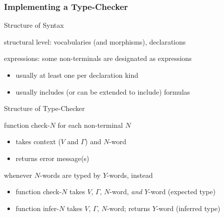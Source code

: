 \begin{frame}\frametitle{Implementing a Type-Checker}
\begin{blockitems}{Structure of Syntax}
\item structural level: vocabularies (and morphisms), declarations
\item expressions: some non-terminals are designated as expressions
 \begin{itemize}
 \item usually at least one per declaration kind
 \item usually includes (or can be extended to include) formulas
 \end{itemize}
\end{blockitems}

\begin{blockitems}{Structure of Type-Checker}
\item function check-$N$ for each non-terminal $N$
 \begin{itemize}
 \item takes context ($V$ and $\Gamma$) and $N$-word
 \item returns error message(s)
 \end{itemize}
\item whenever $N$-words are typed by $Y$-words, instead
 \begin{itemize}
 \item function check-$N$ takes $V$, $\Gamma$, $N$-word, \emph{and} $Y$-word (expected type)
 \item function infer-$N$ takes $V$, $\Gamma$, $N$-word; returns $Y$-word (inferred type)
 \end{itemize}
\end{blockitems}
\end{frame}
